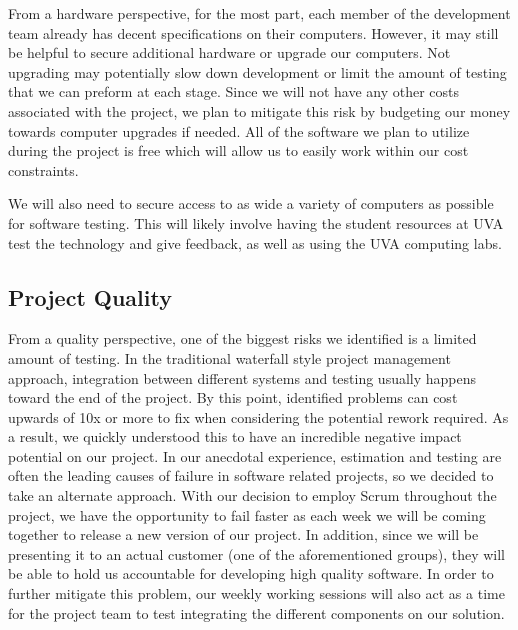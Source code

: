 \documentclass[openright]{report}
\begin{document}
\par From a hardware perspective, for the most part, each member of the development team already has decent specifications on their computers. However, it may still be helpful to secure additional hardware or upgrade our computers. Not upgrading may potentially slow down development or limit the amount of testing that we can preform at each stage. Since we will not have any other costs associated with the project, we plan to mitigate this risk by budgeting our money towards computer upgrades if needed. All of the software we plan to utilize during the project is free which will allow us to easily work within our cost constraints.

\par We will also need to secure access to as wide a variety of computers as possible for software testing. This will likely involve having the student resources at UVA test the technology and give feedback, as well as using the UVA computing labs. 

\subsection{Project Quality}

\par From a quality perspective, one of the biggest risks we identified is a limited amount of testing. In the traditional waterfall style project management approach, integration between different systems and testing usually happens toward the end of the project. By this point, identified problems can cost upwards of 10x or more to fix when considering the potential rework required. As a result, we quickly understood this to have an incredible negative impact potential on our project. In our anecdotal experience, estimation and testing are often the leading causes of failure in software related projects, so we decided to take an alternate approach. With our decision to employ Scrum throughout the project, we have the opportunity to fail faster as each week we will be coming together to release a new version of our project. In addition, since we will be presenting it to an actual customer (one of the aforementioned groups), they will be able to hold us accountable for developing high quality software. In order to further mitigate this problem, our weekly working sessions will also act as a time for the project team to test integrating the different components on our solution.
\end{document}
